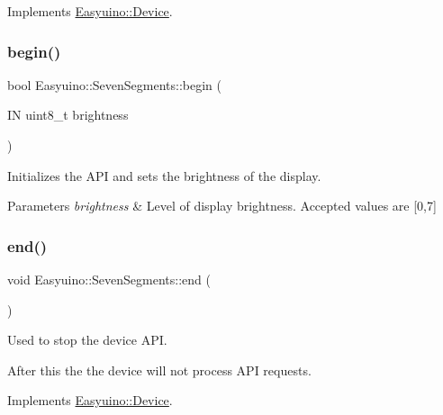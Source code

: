 Implements \hyperlink{class_easyuino_1_1_device_a2e7bb2fec849719a9d9432b57cdb72ba}{Easyuino\+::\+Device}.

\mbox{\label{class_easyuino_1_1_seven_segments_a5bca3d50fdabd6d6376df20d4c561f0d}} 
\subsubsection{\texorpdfstring{begin()}{begin()}\hspace{0.1cm}{\footnotesize\ttfamily [2/2]}}
{\footnotesize\ttfamily bool Easyuino\+::\+Seven\+Segments\+::begin (\begin{DoxyParamCaption}\item[{IN uint8\+\_\+t}]{brightness }\end{DoxyParamCaption})}



Initializes the A\+PI and sets the brightness of the display. 


\begin{DoxyParams}{Parameters}
{\em brightness} & Level of display brightness. Accepted values are \mbox{[}0,7\mbox{]} \\
\hline
\end{DoxyParams}
\mbox{\label{class_easyuino_1_1_seven_segments_afea49385382a7b9c597b4fe42a003fee}} 
\subsubsection{\texorpdfstring{end()}{end()}}
{\footnotesize\ttfamily void Easyuino\+::\+Seven\+Segments\+::end (\begin{DoxyParamCaption}{ }\end{DoxyParamCaption})\hspace{0.3cm}{\ttfamily [virtual]}}



Used to stop the device A\+PI. 

After this the the device will not process A\+PI requests. 

Implements \hyperlink{class_easyuino_1_1_device_ab31018ef64adc84aa2ea575b2297548f}{Easyuino\+::\+Device}.

